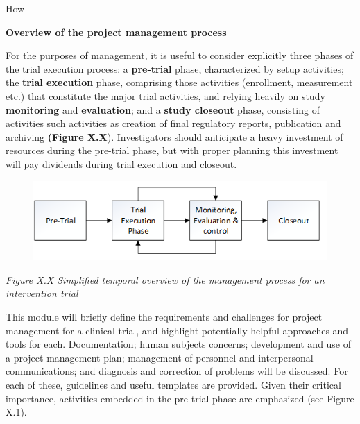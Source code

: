 \documentclass[]{book}
\begin{document}
How

\textbf{Overview of the project management process }

For the purposes of management, it is useful to consider explicitly
three phases of the trial execution process: a \textbf{pre-trial} phase,
characterized by setup activities; the \textbf{trial execution} phase,
comprising those activities (enrollment, measurement etc.) that
constitute the major trial activities, and relying heavily on study
\textbf{monitoring} and \textbf{evaluation}; and a \textbf{study
closeout} phase, consisting of activities such activities as creation of
final regulatory reports, publication and archiving \textbf{(Figure
X.X}). Investigators should anticipate a heavy investment of resources
during the pre-trial phase, but with proper planning this investment
will pay dividends during trial execution and closeout.

\begin{figure}[htbp]
\centering
\includegraphics{images/book/pm1.png}
\caption{}
\end{figure}

\emph{Figure X.X Simplified temporal overview of the management process
for an intervention trial }

This module will briefly define the requirements and challenges for
project management for a clinical trial, and highlight potentially
helpful approaches and tools for each. Documentation; human subjects
concerns; development and use of a project management plan; management
of personnel and interpersonal communications; and diagnosis and
correction of problems will be discussed. For each of these, guidelines
and useful templates are provided. Given their critical importance,
activities embedded in the pre-trial phase are emphasized (see Figure
X.1).
\end{document}

